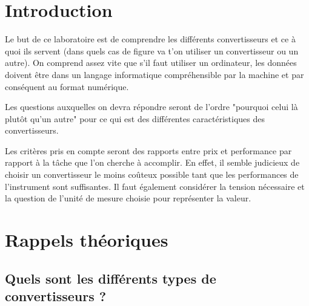 \documentclass[a4paper]{article}
\begin{document}
\let\cleardoublepage\clearpage















\section{Introduction}





Le but de ce laboratoire est de comprendre les différents convertisseurs et ce à quoi ils servent (dans quels cas de figure va t’on utiliser un convertisseur ou un autre). On comprend assez vite que s'il faut utiliser un ordinateur, les données doivent être dans un langage informatique compréhensible par la machine et par conséquent au format numérique.

Les questions auxquelles on devra répondre seront de l’ordre "pourquoi celui là plutôt qu’un autre" pour ce qui est des différentes caractéristiques des convertisseurs.

Les critères pris en compte seront des rapports entre prix et performance par rapport à la tâche que l’on cherche à accomplir. En effet, il semble judicieux de choisir un convertisseur le moins coûteux possible tant que les performances de l’instrument sont suffisantes. Il faut également considérer la tension nécessaire et la question de l’unité de mesure choisie pour représenter la valeur. 














\section{Rappels théoriques}










\subsection{Quels sont les différents types de convertisseurs ?}
\end{document}

